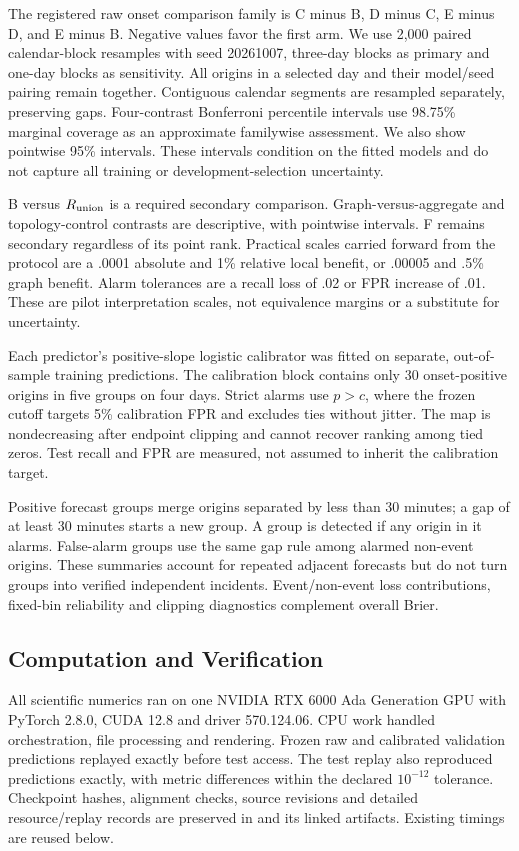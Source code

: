 \documentclass{llncs}
\begin{document}
The registered raw onset comparison family is C minus B, D minus C, E minus D, and E minus B. Negative values favor the first arm. We use 2,000 paired calendar-block resamples with seed 20261007, three-day blocks as primary and one-day blocks as sensitivity. All origins in a selected day and their model/seed pairing remain together. Contiguous calendar segments are resampled separately, preserving gaps. Four-contrast Bonferroni percentile intervals use 98.75\% marginal coverage as an approximate familywise assessment. We also show pointwise 95\% intervals. These intervals condition on the fitted models and do not capture all training or development-selection uncertainty.

B versus $R_{\rm union}$ is a required secondary comparison. Graph-versus-aggregate and topology-control contrasts are descriptive, with pointwise intervals. F remains secondary regardless of its point rank. Practical scales carried forward from the protocol are a .0001 absolute and 1\% relative local benefit, or .00005 and .5\% graph benefit. Alarm tolerances are a recall loss of .02 or FPR increase of .01. These are pilot interpretation scales, not equivalence margins or a substitute for uncertainty.

Each predictor's positive-slope logistic calibrator was fitted on separate, out-of-sample training predictions. The calibration block contains only 30 onset-positive origins in five groups on four days. Strict alarms use $p>c$, where the frozen cutoff targets 5\% calibration FPR and excludes ties without jitter. The map is nondecreasing after endpoint clipping and cannot recover ranking among tied zeros. Test recall and FPR are measured, not assumed to inherit the calibration target.

Positive forecast groups merge origins separated by less than 30 minutes; a gap of at least 30 minutes starts a new group. A group is detected if any origin in it alarms. False-alarm groups use the same gap rule among alarmed non-event origins. These summaries account for repeated adjacent forecasts but do not turn groups into verified independent incidents. Event/non-event loss contributions, fixed-bin reliability and clipping diagnostics complement overall Brier.

\subsection{Computation and Verification}
All scientific numerics ran on one NVIDIA RTX 6000 Ada Generation GPU with PyTorch 2.8.0, CUDA 12.8 and driver 570.124.06. CPU work handled orchestration, file processing and rendering. Frozen raw and calibrated validation predictions replayed exactly before test access. The test replay also reproduced predictions exactly, with metric differences within the declared $10^{-12}$ tolerance. Checkpoint hashes, alignment checks, source revisions and detailed resource/replay records are preserved in  and its linked artifacts. Existing timings are reused below.
\end{document}

